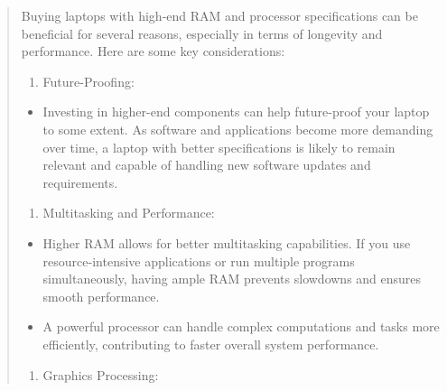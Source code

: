\documentclass[14pt, letterpaper,twoside]{extreport}
\begin{document}
\begin{quote}
    Buying laptops with high-end RAM and processor specifications can be beneficial for several reasons, especially in terms of longevity and performance. Here are some key considerations:
    
    \begin{enumerate}
        \def\labelenumi{\arabic{enumi}.}
        
        \item
              Future-Proofing:
    \end{enumerate}
    
    \begin{itemize}

        \item
              Investing in higher-end components can help future-proof your laptop to some extent. As software and applications become more demanding over time, a laptop with better specifications is likely to remain relevant and capable of handling new software updates and requirements.
    \end{itemize}
    
    \begin{enumerate}
        \def\labelenumi{\arabic{enumi}.}
        \setcounter{enumi}{1}
        
        \item
              Multitasking and Performance:
    \end{enumerate}
    
    \begin{itemize}

        \item
              Higher RAM allows for better multitasking capabilities. If you use resource-intensive applications or run multiple programs simultaneously, having ample RAM prevents slowdowns and ensures smooth performance.
        \item
              A powerful processor can handle complex computations and tasks more efficiently, contributing to faster overall system performance.
    \end{itemize}
    
    \begin{enumerate}
        \def\labelenumi{\arabic{enumi}.}
        \setcounter{enumi}{2}
        
        \item
              Graphics Processing:
    \end{enumerate}
    

\end{quote}
\end{document}
